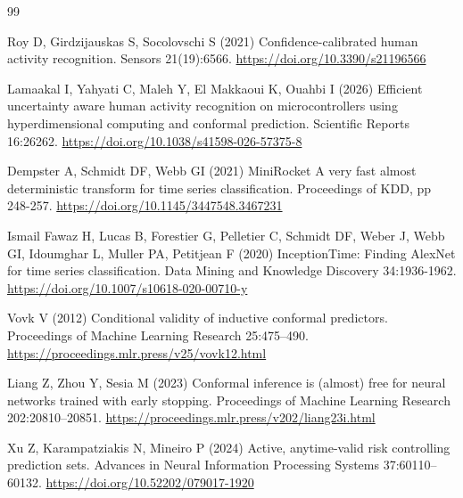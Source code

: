 \documentclass[pdflatex,sn-basic,Numbered,iicol]{sn-jnl}
\begin{document}
\begin{thebibliography}{99}
\begin{minipage}[t]{\linewidth}Roy D, Girdzijauskas S, Socolovschi S (2021) Confidence-calibrated human activity recognition. Sensors 21(19):6566. \url{https://doi.org/10.3390/s21196566}\end{minipage}

\begin{minipage}[t]{\linewidth}Lamaakal I, Yahyati C, Maleh Y, El Makkaoui K, Ouahbi I (2026) Efficient uncertainty aware human activity recognition on microcontrollers using hyperdimensional computing and conformal prediction. Scientific Reports 16:26262. \url{https://doi.org/10.1038/s41598-026-57375-8}\end{minipage}

\begin{minipage}[t]{\linewidth}Dempster A, Schmidt DF, Webb GI (2021) MiniRocket A very fast almost deterministic transform for time series classification. Proceedings of KDD, pp 248-257. \url{https://doi.org/10.1145/3447548.3467231}\end{minipage}

\begin{minipage}[t]{\linewidth}Ismail Fawaz H, Lucas B, Forestier G, Pelletier C, Schmidt DF, Weber J, Webb GI, Idoumghar L, Muller PA, Petitjean F (2020) InceptionTime: Finding AlexNet for time series classification. Data Mining and Knowledge Discovery 34:1936-1962. \url{https://doi.org/10.1007/s10618-020-00710-y}\end{minipage}

\begin{minipage}[t]{\linewidth}Vovk V (2012) Conditional validity of inductive conformal predictors. Proceedings of Machine Learning Research 25:475--490. \url{https://proceedings.mlr.press/v25/vovk12.html}\end{minipage}

\begin{minipage}[t]{\linewidth}Liang Z, Zhou Y, Sesia M (2023) Conformal inference is (almost) free for neural networks trained with early stopping. Proceedings of Machine Learning Research 202:20810--20851. \url{https://proceedings.mlr.press/v202/liang23i.html}\end{minipage}

\begin{minipage}[t]{\linewidth}Xu Z, Karampatziakis N, Mineiro P (2024) Active, anytime-valid risk controlling prediction sets. Advances in Neural Information Processing Systems 37:60110--60132. \url{https://doi.org/10.52202/079017-1920}\end{minipage}


\end{thebibliography}
\end{document}
